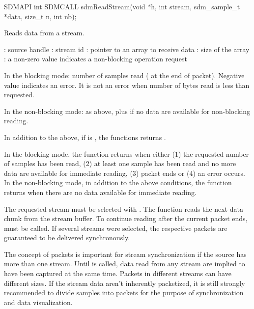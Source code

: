 \documentclass[a4paper,12pt,twoside,extrafontsizes]{memoir}
\begin{document}


\begin{cfuncprototype}
SDMAPI int SDMCALL sdmReadStream(void *h, int stream, sdm_sample_t *data, size_t n, int nb);
\end{cfuncprototype}

\begin{funcdescr}
	Reads data from a stream.
\end{funcdescr}

\begin{funcparams}
	: source handle
	: stream id
	: pointer to an array to receive data
	: size of the array
	: a non-zero value indicates a non-blocking operation request
\end{funcparams}

\begin{funcret}
	In the blocking mode: number of samples read ( at the end of packet). Negative value indicates an error. It is not an error when number of bytes read is less than requested.
	
	In the non-blocking mode: as above, plus  if no data
	are available for non-blocking reading.
	
	In addition to the above, if  is , the functions returns .
\end{funcret}

\begin{funcremarks}
	In the blocking mode, the function returns when either (1) the requested number of samples has been read, (2) at least one sample has been read and no more data are available for immediate reading, (3) packet ends or (4) an error occurs. In the non-blocking mode, in addition to the above conditions, the function returns when there are no data available for immediate reading.
	
	The requested stream must be selected with . The function reads the next data chunk from the stream buffer. To continue reading after the current packet ends,  must be called. If several streams were selected, the respective packets are guaranteed to be delivered synchronously.
	
	The concept of packets is important for stream synchronization if the source has more than one stream. Until  is called, data read from any stream are implied to have been captured at the same time. Packets in different streams can have different sizes. If the stream data aren't inherently packetized, it is still strongly recommended to divide samples into packets for the purpose of synchronization and data visualization.
\end{funcremarks}
\end{document}
